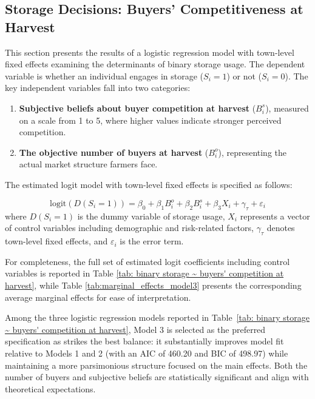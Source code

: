\subsection{Storage Decisions: Buyers' Competitiveness at Harvest}
\noindent 
This section presents the results of a logistic regression model with town-level fixed effects examining the determinants of binary storage usage. The dependent variable is whether an individual engages in storage ($S_i = 1$) or not ($S_i = 0$). The key independent variables fall into two categories:  
\begin{enumerate}
    \item \textbf{Subjective beliefs about buyer competition at harvest} ($B^s_i$), measured on a scale from 1 to 5, where higher values indicate stronger perceived competition.  
    \item \textbf{The objective number of buyers at harvest} ($B^o_i$), representing the actual market structure farmers face. 
\end{enumerate}
The estimated logit model with town-level fixed effects is specified as follows:

\begin{equation}
\text{logit} \left( D(S_i= 1) \right) = \beta_0 + \beta_1 B^o_i + \beta_2 B^s_i + \beta_3 X_i + \gamma_\tau + \varepsilon_i
\label{Eq: empirical first one}
\end{equation}
where $D(S_i=1)$ is the dummy variable of storage usage, $X_i$ represents a vector of control variables including demographic and risk-related factors, $\gamma_\tau$ denotes town-level fixed effects, and $\varepsilon_i$ is the error term.  


For completeness, the full set of estimated logit coefficients including control variables is reported in Table \ref{tab: binary storage ~ buyers' competition at harvest}, while Table \ref{tab:marginal_effects_model3} presents the corresponding average marginal effects for ease of interpretation.  

Among the three logistic regression models reported in Table~\ref{tab: binary storage ~ buyers' competition at harvest}, Model 3 is selected as the preferred specification as strikes the best balance: it substantially improves model fit relative to Models 1 and 2 (with an AIC of 460.20 and BIC of 498.97) while maintaining a more parsimonious structure focused on the main effects. Both the number of buyers and subjective beliefs are statistically significant and align with theoretical expectations.

